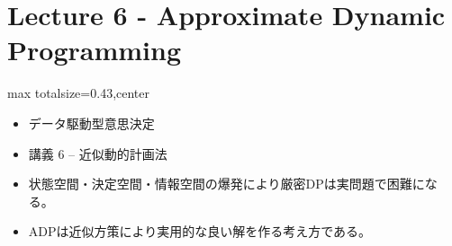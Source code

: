 \section*{Lecture 6 - Approximate Dynamic Programming}

\clearpage
{}
\begin{minipage}[t]{0.405\textwidth}
\begin{adjustbox}{max totalsize={\textwidth}{0.43\textheight},center}
\begin{minipage}{\textwidth}\scriptsize
{}\begin{itemize}
\item データ駆動型意思決定
\item 講義 6 – 近似動的計画法
\end{itemize}\begin{itemize}
\item 状態空間・決定空間・情報空間の爆発により厳密DPは実問題で困難になる。
\item ADPは近似方策により実用的な良い解を作る考え方である。
\end{itemize}
\end{minipage}
\end{adjustbox}
\end{minipage}\hfill
